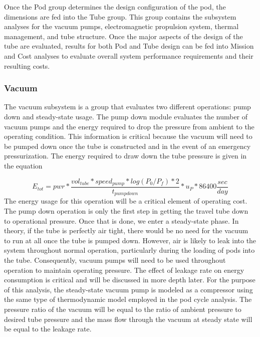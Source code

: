 	Once the Pod group determines the design configuration of the pod, the
	dimensions are fed into the Tube group. This group contains the subsystem
	analyses for the vacuum pumps, electromagnetic propulsion system, thermal
	management, and tube structure. Once the major aspects of the design of the
	tube are evaluated, results for both Pod and Tube design can be fed into
	Mission and Cost analyses to evaluate overall system performance
	requirements and their resulting costs.


\subsubsection{Vacuum}
	The vacuum subsystem is a group that evaluates two different
	operations: pump down and steady-state usage. The pump down module
	evaluates the number of vacuum pumps and the energy required to drop the pressure
	from ambient to the operating condition. This
	information is critical because the vacuum will need to be pumped down
	once the tube is constructed and in the event of an emergency pressurization.
	The energy required to draw down the tube pressure is given in the equation

	\begin{equation}
		\label{eq:vacuum}
		E_{tot} = pwr * \frac{vol_{tube}*speed_{pump}*log(P_{0}/P_{f})*2}{t_{pumpdown}}* u_{P} * 86400 \frac{sec}{day}
	\end{equation}
	The energy usage for this operation will be a critical element of
	operating cost. The pump down operation is only the first step in getting
	the travel tube down to operational pressure. Once that is done, we enter
	a steady-state phase. In theory, if the tube is perfectly air tight, there
	would be no need for the vacuum to run at all once the tube is pumped
	down. However, air is likely to leak into the system throughout normal
	operation, particularly during the loading of pods into the tube.
	Consequently, vacuum pumps will need to be used throughout operation to
	maintain operating pressure. The effect of leakage rate on energy
	consumption is critical and will be discussed in more depth later. For the
	purpose of this analysis, the steady-state vacuum pump is modeled as a
	compressor using the same type of thermodynamic model employed in the pod
	cycle analysis. The pressure ratio
	of the vacuum will be equal to the ratio of ambient pressure to desired
	tube pressure and the mass flow through the vacuum at steady state will be
	equal to the leakage rate.

